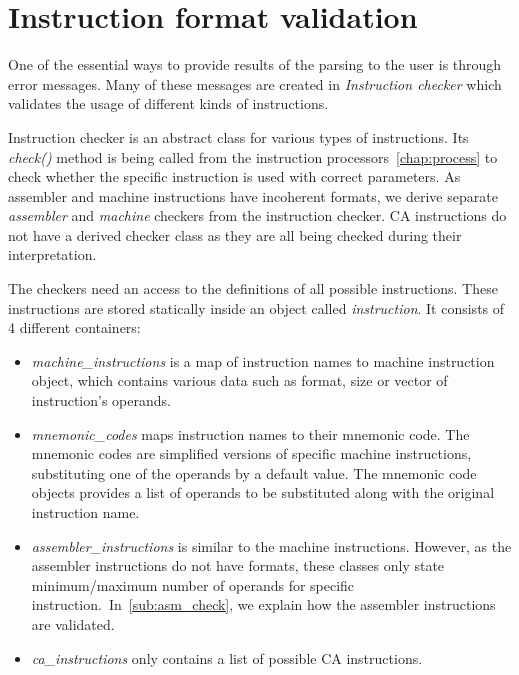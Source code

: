 \section{Instruction format validation}
\label{checker}

One of the essential ways to provide results of the parsing to the user is through error messages. Many of these messages are created in \emph{Instruction checker} which validates the usage of different kinds of instructions.

Instruction checker is an abstract class for various types of instructions. Its \emph{check()} method is being called from the instruction processors~\ref{chap:process} to check whether the specific instruction is used with correct parameters. As assembler and machine instructions have incoherent formats, we derive separate \emph{assembler} and \emph{machine} checkers from the instruction checker. CA instructions do not have a derived checker class as they are all being checked during their interpretation.

The checkers need an access to the definitions of all possible instructions. These instructions are stored statically inside an object called \emph{instruction}. It consists of 4 different containers:
\begin{itemize}
	\item \emph{machine\_instructions} is a map of instruction names to machine instruction object, which contains various data such as format, size or vector of instruction's operands.
	\item \emph{mnemonic\_codes} maps instruction names to their mnemonic code. The mnemonic codes are simplified versions of specific machine instructions, substituting one of the operands by a default value. The mnemonic code objects provides a list of operands to be substituted along with the original instruction name.
	\item \emph{assembler\_instructions} is similar to the machine instructions. However, as the assembler instructions do not have formats, these classes only state minimum/maximum number of operands for specific instruction.~In~\cref{sub:asm_check}, we explain how the assembler instructions are validated.
	\item \emph{ca\_instructions} only contains a list of possible CA instructions.
\end{itemize}

